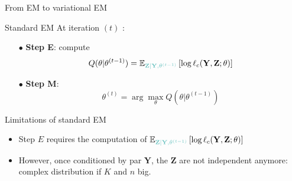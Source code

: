 \documentclass[compress,10pt]{beamer}
\newcommand{\bY}{\mathbf{Y}}
\newcommand{\bX}{\mathbf{Y}}
\newcommand{\bZ}{\mathbf{Z}}
\begin{document}
 \begin{frame}{From EM to variational EM}

 
\begin{block}{Standard EM}
At iteration $(t)$ : 
\begin{itemize}
 \item[$\bullet$]\textbf{Step E}: compute 
 $$ Q(\theta | \theta^{(t-1)}) =   \mathbb E_{\color{dgreen}\bZ | \bX, \theta^{(t-1)} } \left[\log \ell_c(\bY,\bZ; \theta)  \right] $$
 \item[$\bullet$]\textbf{Step M}: 
 $$ \theta^{(t)} = \arg \max_{\theta} Q(\theta | \theta^{(t-1)})$$
 \end{itemize}
% 
%
% 
\end{block}
 
 \end{frame}
 \begin{frame}{Limitations of standard EM}

\begin{itemize}
\item Step $E$ requires the computation of    $ \mathbb E_{\color{dgreen}\bZ | \bX, \theta^{(t-1)} } \left[\log \ell_c(\bX,\bZ; \theta)  \right] $
 \item However, once conditioned by par  $\bX$,  the  $\bZ$ are not independent anymore: complex  distribution if    $K$ and $n$ big. 
  \end{itemize}
 \end{frame}
 
\end{document}

